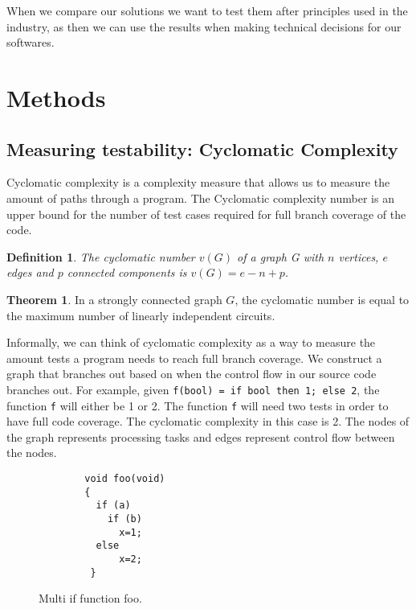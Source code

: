 \documentclass[12pt]{article}
\newtheorem*{definition}{Definition}
\theoremstyle{definition}
\newtheorem*{theorem}{Theorem}
\theoremstyle{theorem}
\begin{document}
When we compare our solutions we want to test them after principles used in the
industry, as then we can use the results when making technical decisions for our
softwares.

\section{Methods}\label{methods}

\subsection{Measuring testability: Cyclomatic Complexity}\label{cyclomaticcomplexity}

Cyclomatic complexity is a complexity measure that allows us to measure the
amount of paths through a program. The Cyclomatic complexity number is an upper
bound for the number of test cases required for full branch coverage of the
code. 

\theoremstyle{definition}
\begin{definition}
The cyclomatic number $v(G)$ of a graph G with $n$ vertices, $e$ edges and $p$
connected components is $v(G) = e - n + p$.
\end{definition}

\begin{theorem}
In a strongly connected graph $G$, the cyclomatic number is equal to the
maximum number of linearly independent circuits.~\cite{McCabe}
\end{theorem}

Informally, we can think of cyclomatic complexity as a way to measure the amount
tests a program needs to reach full branch coverage. We construct a graph that
branches out based on when the control flow in our source code branches out. For
example, given \texttt{f(bool) = if bool then 1; else 2}, the function
\texttt{f} will either be 1 or 2. The function \texttt{f} will need two tests in
order to have full code coverage. The cyclomatic complexity in this case is 2.
The nodes of the graph represents processing tasks and edges represent control
flow between the nodes. 

\begin{figure}[H]
    \begin{lstlisting}
        void foo(void)
        {
          if (a)
            if (b) 
              x=1;
          else
              x=2;
         }
    \end{lstlisting}
    \caption{Multi if function foo.}\label{c1excode}
\end{figure}
\end{document}
